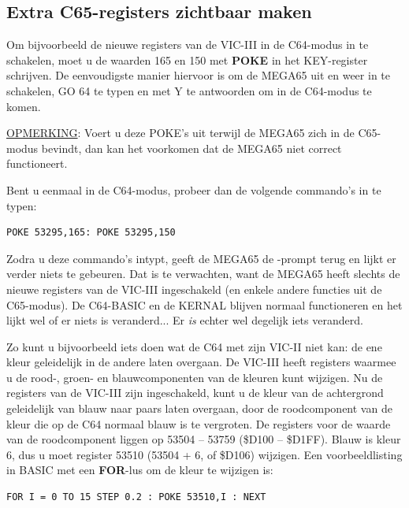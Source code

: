 \subsection{Extra C65-registers zichtbaar maken}

Om bijvoorbeeld de nieuwe registers van de VIC-III in de C64-modus in te schakelen, moet u de waarden 165 en 150 met {\bf POKE} in het KEY-register schrijven. De eenvoudigste manier hiervoor is om de MEGA65 uit en weer in te schakelen, GO 64 te typen en met Y te antwoorden om in de C64-modus te komen.

\underline{OPMERKING}: Voert u deze POKE's uit terwijl de MEGA65 zich in de C65-modus bevindt, dan kan het voorkomen dat de MEGA65 niet correct functioneert.

Bent u eenmaal in de C64-modus, probeer dan de volgende commando's in te typen:
\begin{tcolorbox}[colback=black,coltext=white]
\verbatimfont{\codefont}
\begin{verbatim}
POKE 53295,165: POKE 53295,150
\end{verbatim}
\end{tcolorbox}

Zodra u deze commando's intypt, geeft de MEGA65 de -prompt terug en lijkt er verder niets te gebeuren. Dat is te verwachten, want de MEGA65 heeft slechts de nieuwe registers van de VIC-III ingeschakeld (en enkele andere functies uit de C65-modus). De C64-BASIC en de KERNAL blijven normaal functioneren en het lijkt wel of er niets is veranderd... Er \textit{is} echter wel degelijk iets veranderd.

Zo kunt u bijvoorbeeld iets doen wat de C64 met zijn VIC-II niet kan: de ene kleur geleidelijk in de andere laten overgaan. De VIC-III heeft registers waarmee u de rood-, groen- en blauwcomponenten van de kleuren kunt wijzigen. Nu de registers van de VIC-III zijn ingeschakeld, kunt u de kleur van de achtergrond geleidelijk van blauw naar paars laten overgaan, door de roodcomponent van de kleur die op de C64 normaal blauw is te vergroten. De registers voor de waarde van de roodcomponent liggen op 53504 -- 53759 (\$D100 -- \$D1FF). Blauw is kleur 6, dus u moet register 53510 (53504 + 6, of \$D106) wijzigen. Een voorbeeldlisting in BASIC met een {\bf FOR}-lus om de kleur te wijzigen is:

\begin{tcolorbox}[colback=black,coltext=white]
\verbatimfont{\codefont}
\begin{verbatim}
FOR I = 0 TO 15 STEP 0.2 : POKE 53510,I : NEXT
\end{verbatim}
\end{tcolorbox}

